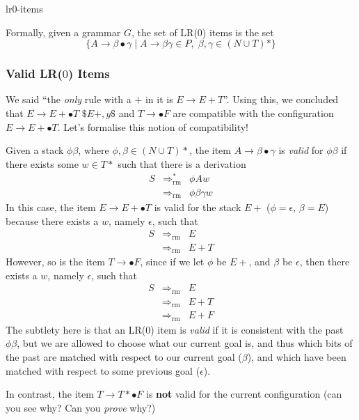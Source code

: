\begin{center}
    {lr0-items}
\end{center}

Formally, given a grammar $G$, the set of LR($0$) items is the set
\[ \{ A \to \beta \bullet \gamma \mid A \to \beta \gamma \in P, \; \beta, \gamma \in (N \cup T)*\} \]

\subsubsection{Valid LR($0$) Items}
We said ``the \textit{only} rule with a $+$ in it is $E \to E + T$''. Using this, we concluded that $E \to E + \bullet T$ $\$E+, y\$$ and $T \to \bullet F$ are compatible with the configuration $E \to E + \bullet T$. Let's formalise this notion of compatibility!

Given a stack $\phi \beta$, where $\phi, \beta \in (N \cup T)*$, the item $A \to \beta \bullet \gamma$ is \textit{valid} for $\phi \beta$ if there exists some $w \in T*$ such that there is a derivation
\[\begin{array}{rrl}
     S &\Rightarrow^*_\text{rm}&\phi A w  \\
     & \Rightarrow_\text{rm} & \phi \beta \gamma w
\end{array}\]
In this case, the item $E \to E + \bullet T$ is valid for the stack $E+$ ($\phi = \epsilon$, $\beta = E$) because there exists a $w$, namely $\epsilon$, such that
\[\begin{array}{rrl}
     S &\Rightarrow_\text{rm}&E \\
     & \Rightarrow_\text{rm} & E+T
\end{array}\]
However, so is the item $T \to \bullet F$, since if we let $\phi$ be $E+$, and $\beta$ be $\epsilon$, then there exists a $w$, namely $\epsilon$, such that 
\[\begin{array}{rrl}
     S &\Rightarrow_\text{rm}&E \\
     & \Rightarrow_\text{rm} & E+T \\
     & \Rightarrow_\text{rm} & E+F
\end{array}\]
The subtlety here is that an LR($0$) item is \textit{valid} if it is consistent with the past $\phi\beta$, but we are allowed to choose what our current goal is, and thus which bits of the past are matched with respect to our current goal ($\beta$), and which have been matched with respect to some previous goal ($\epsilon$).

In contrast, the item $T \to T * \bullet F$ is \textbf{not} valid for the current configuration (can you see why? Can you \textit{prove} why?)

